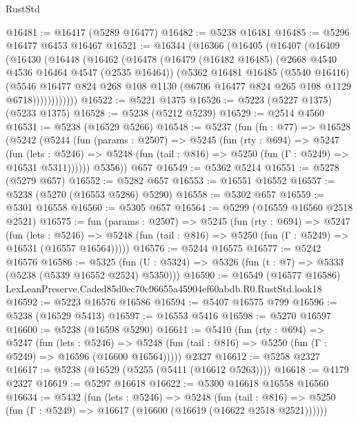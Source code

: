 \begin{lexlean}{RustStd}
\begin{coremodule}
@16481 := @16417 (@5289 @16477)
@16482 := @5238 @16481
@16485 := @5296 @16477 @6453 @16467
@16521 := @16344
    (@16366
      (@16405
        (@16407
          (@16409
            (@16430
              (@16448
                (@16462
                  (@16478
                    (@16479
                      (@16482 @16485)
                      (@2668 @4540 @4536 @16464 @4547 (@2535 @16464))
                      (@5362
                        @16481
                        @16485
                        (@5540 @16416)
                        (@5546
                          @16477
                          @824
                          @268
                          @108
                          @1130
                          (@6706 @16477 @824 @265 @108 @1129 @6718))))))))))))
@16522 := @5221 @1375
@16526 := @5223 (@5227 @1375) (@5233 @1375)
@16528 := @5238 (@5212 @5239)
@16529 := @2514 @4560
@16531 := @5238 (@16529 @5266)
@16548 := @5237
    (fun (fn : @77) =>
    @16528
      (@5242
        (@5244
          (fun (params : @2507) =>
          @5245
            (fun (rty : @694) =>
            @5247
              (fun (lets : @5246) =>
              @5248 (fun (tail : @816) => @5250 (fun (Γ : @5249) => @16531 @5311))))))
        @5356))
    @657
@16549 := @5362 @5214
@16551 := @5278 (@5279 @657)
@16552 := @5282 @657
@16553 := @16551 @16552
@16557 := @5238 (@5270 (@16553 @5286) @5290)
@16558 := @5302 @657
@16559 := @5301 @16558
@16560 := @5305 @657
@16564 := @5299 (@16559 @16560 @2518 @2521)
@16575 := fun (params : @2507) =>
  @5245
    (fun (rty : @694) =>
    @5247
      (fun (lets : @5246) =>
      @5248 (fun (tail : @816) => @5250 (fun (Γ : @5249) => @16531 (@16557 @16564)))))
@16576 := @5244 @16575
@16577 := @5242 @16576
@16586 := @5325
    (fun (U : @5324) => @5326 (fun (t : @7) => @5333 (@5238 (@5339 @16552 @2524) @5350)))
@16590 := @16549 (@16577 @16586) LexLeanPreserve.Caded85d0ec70c96655a45904ef60abdb.R0.RustStd.look18
@16592 := @5223 @16576 @16586
@16594 := @5407 @16575 @799
@16596 := @5238 (@16529 @5413)
@16597 := @16553 @5416
@16598 := @5270 @16597
@16600 := @5238 (@16598 @5290)
@16611 := @5410
    (fun (rty : @694) =>
    @5247
      (fun (lets : @5246) =>
      @5248 (fun (tail : @816) => @5250 (fun (Γ : @5249) => @16596 (@16600 @16564)))))
    @2327
@16612 := @5258 @2327
@16617 := @5238 (@16529 (@5255 (@5411 (@16612 @5263))))
@16618 := @4179 @2327
@16619 := @5297 @16618
@16622 := @5300 @16618 @16558 @16560
@16634 := @5432
    (fun (lets : @5246) =>
    @5248
      (fun (tail : @816) =>
      @5250 (fun (Γ : @5249) => @16617 (@16600 (@16619 (@16622 @2518 @2521))))))

\end{coremodule}
\end{lexlean}
